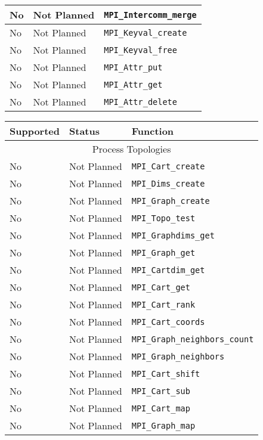 \documentclass{report}
\begin{document}
\begin{tabular}{|l|l|l|}
No             & Not Planned        & \verb|MPI_Intercomm_merge| \\ \hline
No             & Not Planned        & \verb|MPI_Keyval_create| \\ \hline
No             & Not Planned        & \verb|MPI_Keyval_free| \\ \hline
No             & Not Planned        & \verb|MPI_Attr_put| \\ \hline
No             & Not Planned        & \verb|MPI_Attr_get| \\ \hline
No             & Not Planned        & \verb|MPI_Attr_delete| \\ \hline

\end{tabular}

\begin{tabular}{|l|l|l|}
\hline
\bf{Supported} & \bf{Status}       & \bf{Function} \\ \hline

\multicolumn{3}{|c|}{ Process Topologies } \\ \hline

No             & Not Planned        & \verb|MPI_Cart_create| \\ \hline
No             & Not Planned        & \verb|MPI_Dims_create| \\ \hline
No             & Not Planned        & \verb|MPI_Graph_create| \\ \hline
No             & Not Planned        & \verb|MPI_Topo_test| \\ \hline
No             & Not Planned        & \verb|MPI_Graphdims_get| \\ \hline
No             & Not Planned        & \verb|MPI_Graph_get| \\ \hline
No             & Not Planned        & \verb|MPI_Cartdim_get| \\ \hline
No             & Not Planned        & \verb|MPI_Cart_get| \\ \hline
No             & Not Planned        & \verb|MPI_Cart_rank| \\ \hline
No             & Not Planned        & \verb|MPI_Cart_coords| \\ \hline
No             & Not Planned        & \verb|MPI_Graph_neighbors_count| \\ \hline
No             & Not Planned        & \verb|MPI_Graph_neighbors| \\ \hline
No             & Not Planned        & \verb|MPI_Cart_shift| \\ \hline
No             & Not Planned        & \verb|MPI_Cart_sub| \\ \hline
No             & Not Planned        & \verb|MPI_Cart_map| \\ \hline
No             & Not Planned        & \verb|MPI_Graph_map| \\ \hline


\end{tabular}
\end{document}
